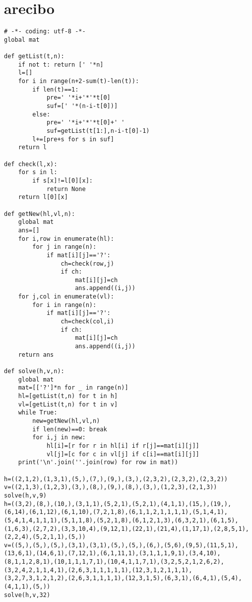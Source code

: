 \documentclass[onecolumn,a4paper,12pt]{article}
\begin{document}
\section{arecibo}
\begin{lstlisting}
# -*- coding: utf-8 -*-
global mat

def getList(t,n):
    if not t: return [' '*n]
    l=[]
    for i in range(n+2-sum(t)-len(t)):
        if len(t)==1:
            pre=' '*i+'*'*t[0]
            suf=[' '*(n-i-t[0])]
        else:
            pre=' '*i+'*'*t[0]+' '
            suf=getList(t[1:],n-i-t[0]-1)
        l+=[pre+s for s in suf]
    return l

def check(l,x):
    for s in l:
        if s[x]!=l[0][x]:
            return None
    return l[0][x]

def getNew(hl,vl,n):
    global mat
    ans=[]
    for i,row in enumerate(hl):
        for j in range(n):
            if mat[i][j]=='?':
                ch=check(row,j)
                if ch:
                    mat[i][j]=ch
                    ans.append((i,j))
    for j,col in enumerate(vl):
        for i in range(n):
            if mat[i][j]=='?':
                ch=check(col,i)
                if ch:
                    mat[i][j]=ch
                    ans.append((i,j))
    return ans

def solve(h,v,n):
    global mat
    mat=[['?']*n for _ in range(n)]
    hl=[getList(t,n) for t in h]
    vl=[getList(t,n) for t in v]
    while True:
        new=getNew(hl,vl,n)
        if len(new)==0: break
        for i,j in new:
            hl[i]=[r for r in hl[i] if r[j]==mat[i][j]]
            vl[j]=[c for c in vl[j] if c[i]==mat[i][j]]
    print('\n'.join(''.join(row) for row in mat))

h=((2,1,2),(1,3,1),(5,),(7,),(9,),(3,),(2,3,2),(2,3,2),(2,3,2))
v=((2,1,3),(1,2,3),(3,),(8,),(9,),(8,),(3,),(1,2,3),(2,1,3))
solve(h,v,9)
h=((3,2),(8,),(10,),(3,1,1),(5,2,1),(5,2,1),(4,1,1),(15,),(19,),(6,14),(6,1,12),(6,1,10),(7,2,1,8),(6,1,1,2,1,1,1,1),(5,1,4,1),(5,4,1,4,1,1,1),(5,1,1,8),(5,2,1,8),(6,1,2,1,3),(6,3,2,1),(6,1,5),(1,6,3),(2,7,2),(3,3,10,4),(9,12,1),(22,1),(21,4),(1,17,1),(2,8,5,1),(2,2,4),(5,2,1,1),(5,))
v=((5,),(5,),(5,),(3,1),(3,1),(5,),(5,),(6,),(5,6),(9,5),(11,5,1),(13,6,1),(14,6,1),(7,12,1),(6,1,11,1),(3,1,1,1,9,1),(3,4,10),(8,1,1,2,8,1),(10,1,1,1,7,1),(10,4,1,1,7,1),(3,2,5,2,1,2,6,2),(3,2,4,2,1,1,4,1),(2,6,3,1,1,1,1,1),(12,3,1,2,1,1,1),(3,2,7,3,1,2,1,2),(2,6,3,1,1,1,1),(12,3,1,5),(6,3,1),(6,4,1),(5,4),(4,1,1),(5,))
solve(h,v,32)
\end{lstlisting}
\end{document}
